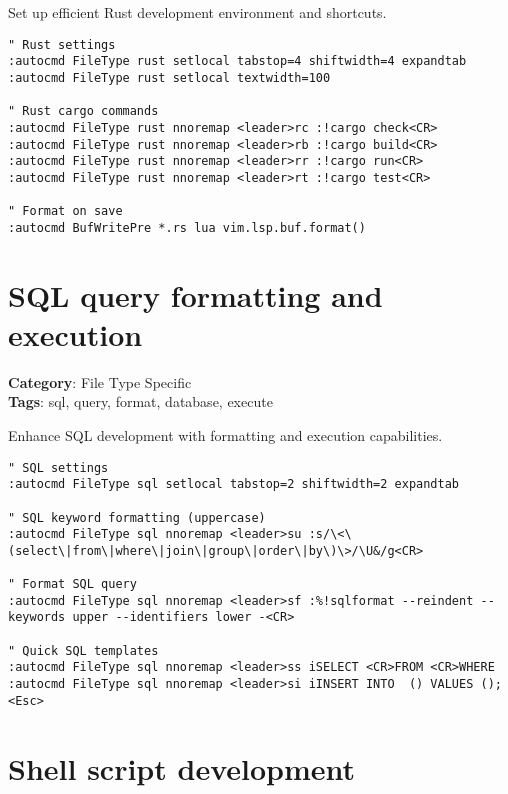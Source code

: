 {{{{{Set up efficient Rust development environment and shortcuts.

\begin{Exa*}{}
\begin{Verbatim}[fontsize=\footnotesize, breaklines, breakanywhere]
" Rust settings
:autocmd FileType rust setlocal tabstop=4 shiftwidth=4 expandtab
:autocmd FileType rust setlocal textwidth=100

" Rust cargo commands
:autocmd FileType rust nnoremap <leader>rc :!cargo check<CR>
:autocmd FileType rust nnoremap <leader>rb :!cargo build<CR>
:autocmd FileType rust nnoremap <leader>rr :!cargo run<CR>
:autocmd FileType rust nnoremap <leader>rt :!cargo test<CR>

" Format on save
:autocmd BufWritePre *.rs lua vim.lsp.buf.format()
\end{Verbatim}
\end{Exa*}

\section{SQL query formatting and execution}

\textbf{Category}: File Type Specific\\ \textbf{Tags}: sql, query, format, database, execute
\vspace{0.5cm}

Enhance SQL development with formatting and execution capabilities.

\begin{Exa*}{}
\begin{Verbatim}[fontsize=\footnotesize, breaklines, breakanywhere]
" SQL settings
:autocmd FileType sql setlocal tabstop=2 shiftwidth=2 expandtab

" SQL keyword formatting (uppercase)
:autocmd FileType sql nnoremap <leader>su :s/\<\(select\|from\|where\|join\|group\|order\|by\)\>/\U&/g<CR>

" Format SQL query
:autocmd FileType sql nnoremap <leader>sf :%!sqlformat --reindent --keywords upper --identifiers lower -<CR>

" Quick SQL templates
:autocmd FileType sql nnoremap <leader>ss iSELECT <CR>FROM <CR>WHERE 
:autocmd FileType sql nnoremap <leader>si iINSERT INTO  () VALUES ();<Esc>
\end{Verbatim}
\end{Exa*}

\section{Shell script development}

}}}}}
